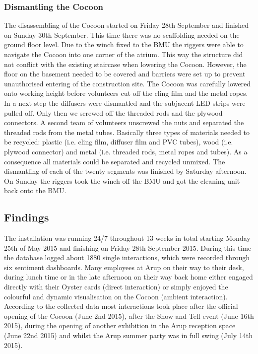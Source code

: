 \subsubsection*{Dismantling the Cocoon}

The disassembling of the Cocoon started on Friday 28th September and finished on Sunday 30th September. This time there was no scaffolding needed on the ground floor level. Due to the winch fixed to the BMU the riggers were able to navigate the Cocoon into one corner of the atrium. This way the structure did not conflict with the existing staircase when lowering the Cocoon. However, the floor on the basement needed to be covered and barriers were set up to prevent unauthorised entering of the construction site. 
The Cocoon was carefully lowered onto working height before volunteers cut off the cling film and the metal ropes. In a next step the diffusers were dismantled and the subjacent LED strips were pulled off. Only then we screwed off the threaded rods and the plywood connectors. A second team of volunteers unscrewed the nuts and separated the threaded rods from the metal tubes. Basically three types of materials needed to be recycled: plastic (i.e. cling film, diffuser film and PVC tubes), wood (i.e. plywood connector) and metal (i.e. threaded rods, metal ropes and tubes). As a consequence all materials could be separated and recycled unmixed. The dismantling of each of the twenty segments was finished by Saturday afternoon. On Sunday the riggers took the winch off the BMU and got the cleaning unit back onto the BMU.

\subsection{Findings}

The installation was running 24/7 throughout 13 weeks in total starting Monday 25th of May 2015 and finishing on Friday 28th September 2015. During this time the database logged about 1880 single interactions, which were recorded through six sentiment dashboards. Many employees at Arup on their way to their desk, during lunch time or in the late afternoon on their way back home either engaged directly with their Oyster cards (direct interaction) or simply enjoyed the colourful and dynamic visualisation on the Cocoon (ambient interaction). According to the collected data most interactions took place after the official opening of the Cocoon (June 2nd 2015), after the Show and Tell event (June 16th 2015), during the opening of another exhibition in the Arup reception space (June 22nd 2015) and whilst the Arup summer party was in full swing (July 14th 2015).

